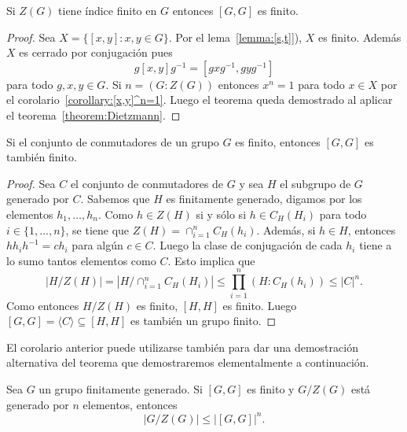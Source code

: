 \begin{theorem}[Schur]
	\label{theorem:Schur_commutador}
	Si $Z(G)$ tiene índice finito en $G$ entonces $[G,G]$ es finito.
\end{theorem}

\begin{proof}
	Sea $X=\{[x,y]:x,y\in G\}$. Por el lema~\ref{lemma:[s,t]}), $X$ es finito.
	Además $X$ es cerrado por conjugación pues
	\[
		g[x,y]g^{-1}=[gxg^{-1},gyg^{-1}]
	\]
	para todo $g,x,y\in G$. Si $n=(G:Z(G))$ entonces $x^n=1$ para todo $x\in X$
	por el corolario~\ref{corollary:[x,y]^n=1}. Luego el teorema queda demostrado 
	al aplicar el teorema~\ref{theorem:Dietzmann}.
\end{proof}

\begin{corollary}[Sury]
	Si el conjunto de conmutadores de un grupo $G$ es finito, entonces
	$[G,G]$ es también finito.
\end{corollary}

\begin{proof}
	Sea $C$ el conjunto de conmutadores de $G$ y sea $H$ el subgrupo de $G$
	generado por $C$. Sabemos que $H$ es finitamente generado, digamos por los elementos 
	$h_1,\dots,h_n$. Como $h\in Z(H)$ si y sólo si $h\in C_H(H_i)$ para todo
	$i\in\{1,\dots,n\}$, se tiene que $Z(H)=\cap_{i=1}^n C_H(h_i)$. Además, si
	$h\in H$, entonces $hh_ih^{-1}=ch_i$ para algún $c\in C$. Luego la clase de
	conjugación de cada $h_i$ tiene a lo sumo tantos elementos como $C$. Esto
	implica que
	\[
		|H/Z(H)|=|H/\cap_{i=1}^n C_H(H_i)|\leq\prod_{i=1}^n (H:C_H(h_i))\leq |C|^n.
	\]
	Como entonces $H/Z(H)$ es finito, $[H,H]$ es finito. Luego 
	$[G,G]=\langle C\rangle\subseteq [H,H]$ 
	es también un grupo finito.
\end{proof}

El corolario anterior puede utilizarse también para dar una demostración
alternativa del teorema que demostraremos elementalmente a continuación. 

\begin{theorem}
	Sea $G$ un grupo finitamente generado. Si $[G,G]$ es finito y $G/Z(G)$ está generado por 
	$n$ elementos, entonces 
	\[
	|G/Z(G)|\leq |[G,G]|^n. 
	\]
\end{theorem}

